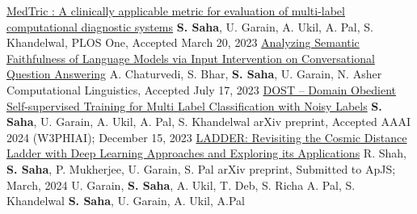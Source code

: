 \documentclass[10pt,a4paper]{article}
\begin{document}
\headedsection
  { \href{https://doi.org/10.1371/journal.pone.0283895}{MedTric : A clinically applicable metric for evaluation of multi-label computational diagnostic systems}}
  {\textbf{S. Saha}, U. Garain, A. Ukil, A. Pal, S. Khandelwal,} {%
  \headedsubsection
    {PLOS One, }
    {Accepted March 20, 2023}{}
}
\vspace{0.6em}
\headedsection
  { \href{https://arxiv.org/abs/2212.10696}{Analyzing Semantic Faithfulness of Language Models via Input Intervention on Conversational Question Answering}}
  {A. Chaturvedi, S. Bhar, \textbf{S. Saha}, U. Garain, N. Asher} {%
  \headedsubsection
    {Computational Linguistics, }
    {Accepted July 17, 2023}{}
}
\vspace{0.6em}
\headedsection
  { \href{https://arxiv.org/abs/2308.05101}{DOST -- Domain Obedient Self-supervised Training for Multi Label Classification with Noisy Labels}}
  {\textbf{S. Saha}, U. Garain, A. Ukil, A. Pal, S. Khandelwal} {%
  \headedsubsection
    {arXiv preprint, }
    {Accepted AAAI 2024 (W3PHIAI);  December 15, 2023}{}
}
\vspace{0.6em}
\headedsection
  { \href{https://arxiv.org/abs/2401.17029}{LADDER: Revisiting the Cosmic Distance Ladder with Deep Learning Approaches and Exploring its Applications}}
  {R. Shah, \textbf{S. Saha}, P. Mukherjee, U. Garain, S. Pal} {%
  \headedsubsection
    {arXiv preprint, }
    {Submitted to ApJS;  March, 2024}{}
}
\vspace{1em}
\spacedhrule{-0.2em}{-0.4em}
  {U. Garain, \textbf{S. Saha}, A. Ukil, T. Deb, S. Richa A. Pal, S. Khandelwal}{
  }
\vspace{2em}
  {\textbf{S. Saha}, U. Garain, A. Ukil, A.Pal}{
  }
\vspace{1em}
\spacedhrule{-0.2em}{-0.4em}
\end{document}
